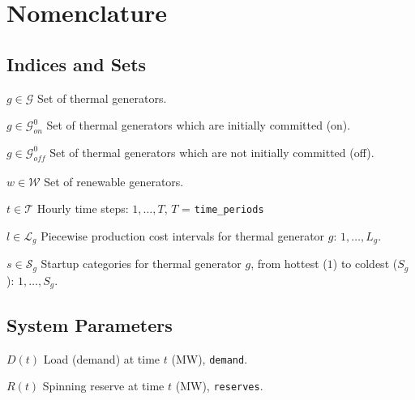 \documentclass{article}
\newcommand{\cT}{{\mathcal T}}
\newcommand{\cS}{{\mathcal S}}
\newcommand{\cG}{{\mathcal G}}
\newcommand{\cL}{{\mathcal L}}
\newcommand{\cW}{{\mathcal W}}
\newcommand\mydescriptionopt{
	\IEEEsetlabelwidth{$g \in \cG_{\textit{off}}^0$]}
	\IEEEusemathlabelsep
}
\begin{document}
\section{Nomenclature}
\subsection{Indices and Sets}
\begin{IEEEdescription}[\mydescriptionopt] 
	\item[$g \in \cG$] Set of thermal generators.
	\item[$g \in \cG_{\textit{on}}^0$] Set of thermal generators which are initially committed (on).
	\item[$g \in \cG_{\textit{off}}^0$] Set of thermal generators which are not initially committed (off).
	\item[$w \in \cW$] Set of renewable generators.
	\item[$t \in \cT$] Hourly time steps: $1, \ldots, T$, $T$ = {\tt time\_periods}
	\item[$l \in \cL_g$] Piecewise production cost intervals for thermal generator $g$: $1, \ldots, L_g$.
	\item[$s \in \cS_g$] Startup categories for thermal generator $g$, from hottest ($1$) to coldest ($S_g$): $1, \ldots, S_g$.
\end{IEEEdescription}

\subsection{System Parameters}
\begin{IEEEdescription}[\mydescriptionopt]
	\item[$D(t)$]    Load (demand) at time $t$ (MW), {\tt demand}.
	\item[$R(t)$]    Spinning reserve at time $t$ (MW), {\tt reserves}.
\end{IEEEdescription}
\end{document}
